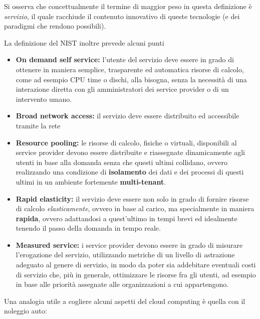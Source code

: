 \documentclass[italian,]{article}
\providecommand{\tightlist}{%
  \setlength{\itemsep}{0pt}\setlength{\parskip}{0pt}}
\begin{document}
Si osserva che concettualmente il termine di maggior peso in questa
definizione è \emph{servizio}, il quale racchiude il contenuto
innovativo di queste tecnologie (e dei paradigmi che rendono possibili).

La definizione del NIST inoltre prevede alcuni punti

\begin{itemize}
\tightlist
\item
  \textbf{On demand self service:} l'utente del servizio deve essere in
  grado di ottenere in maniera semplice, trasparente ed automatica
  risorse di calcolo, come ad esempio CPU time o dischi, alla bisogna,
  senza la necessità di una interazione diretta con gli amministratori
  dei service provider o di un intervento umano.
\item
  \textbf{Broad network access:} il servizio deve essere distribuito ed
  accessibile tramite la rete
\item
  \textbf{Resource pooling:} le risorse di calcolo, fisiche o virtuali,
  disponibili al service provider devono essere distribuite e
  riassegnate dinamicamente agli utenti in base alla domanda senza che
  questi ultimi collidano, ovvero realizzando una condizione di
  \textbf{isolamento} dei dati e dei processi di questi ultimi in un
  ambiente fortemente \textbf{multi-tenant}.
\item
  \textbf{Rapid elasticity:} il servizio deve essere non solo in grado
  di fornire risorse di calcolo \emph{elasticamente}, ovvero in base al
  carico, ma specialmente in maniera \textbf{rapida}, ovvero adattandosi
  a quest'ultimo in tempi brevi ed idealmente tenendo il passo della
  domanda in tempo reale.
\item
  \textbf{Measured service:} i service provider devono essere in grado
  di misurare l'erogazione del servizio, utilizzando metriche di un
  livello di astrazione adeguato al genere di servizio, in modo da poter
  sia addebitare eventuali costi di servizio che, più in generale,
  ottimizzare le risorse fra gli utenti, ad esempio in base alle
  priorità assegnate alle organizzazioni a cui appartengono.
\end{itemize}

Una analogia utile a cogliere alcuni aspetti del cloud computing è
quella con il noleggio auto:
\end{document}
